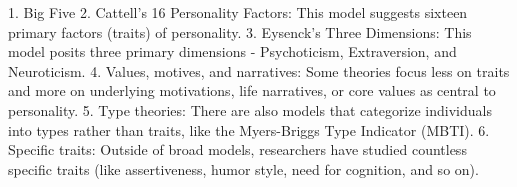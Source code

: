 1. Big Five
2. Cattell's 16 Personality Factors: This model suggests sixteen primary factors (traits) of personality.
3. Eysenck's Three Dimensions: This model posits three primary dimensions - Psychoticism, Extraversion, and Neuroticism.
4. Values, motives, and narratives: Some theories focus less on traits and more on underlying motivations, life narratives, or core values as central to personality.
5. Type theories: There are also models that categorize individuals into types rather than traits, like the Myers-Briggs Type Indicator (MBTI).
6. Specific traits: Outside of broad models, researchers have studied countless specific traits (like assertiveness, humor style, need for cognition, and so on).